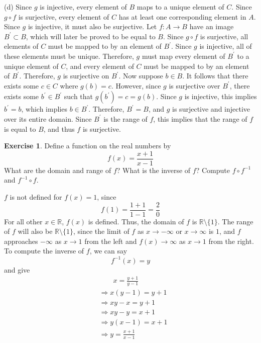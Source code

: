\documentclass{article}
\theoremstyle{definition}
\newtheorem{environment}{Exercise}
\newenvironment{exercise}
    {\begin{mdframed}\begin{environment}}
    {\end{environment}\end{mdframed}}
\begin{document}
(d) Since \(g\) is injective, every element of \(B\) maps to a unique element of \(C\). Since \(g\circ f\) is surjective, every element of \(C\) has at least one corresponding element in \(A\). Since \(g\) is injective, it must also be surjective. Let \(f:A\to B\) have an image \(B^{\prime} \subset B \), which will later be proved to be equal to \(B\). Since \(g\circ f\) is surjective, all elements of \(C\) must be mapped to by an element of \(B^{\prime} \). Since \(g\) is injective, all of these elements must be unique. Therefore, \(g\) must map every element of \(B^{\prime} \) to a unique element of \(C\), and every element of \(C\) must be mapped to by an element of \(B^{\prime} \). Therefore, \(g\) is surjective on \(B^{\prime} \). Now suppose \(b\in B\). It follows that there exists some \(c\in C\) where \(g(b)=c\). However, since \(g\) is surjective over \(B^{\prime} \), there exists some \(b^{\prime} \in B^{\prime} \) such that \(g(b^{\prime} )=c=g(b)\). Since \(g\) is injective, this implies \(b^{\prime} =b\), which implies \(b\in B^{\prime} \). Therefore, \(B^{\prime} =B\), and \(g\) is surjective and injective over its entire domain. Since \(B^{\prime} \) is the range of \(f\), this implies that the range of \(f\) is equal to \(B\), and thus \(f\) is surjective.
\begin{exercise}
    Define a function on the real numbers by
    \[
        f(x) = \frac{x+1}{x-1}
    \]
    What are the domain and range of \(f\)? What is the inverse of \(f\)? Compute \(f\circ f^{-1} \) and \(f^{-1} \circ f\).
\end{exercise}
\(f\) is not defined for \(f(x)=1\), since
\[
    f(1)=\frac{1+1}{1-1}=\frac{2}{0}
\]
For all other \(x\in\mathbb{R} \), \(f(x)\) is defined. Thus, the domain of \(f\) is \(\mathbb{R} \setminus \{ 1 \} \). The range of \(f\) will also be \(\mathbb{R} \setminus \{ 1 \} \), since the limit of \(f\) as \(x\to -\infty\) or \(x\to \infty\) is \(1\), and \(f\) approaches \(-\infty\) as \(x\to 1\) from the left and \(f(x)\to \infty\) as \(x\to 1\) from the right. To compute the inverse of \(f\), we can say
\[
    f^{-1} (x)=y
\]
and give
\begin{align*}
    &\qquad x=\frac{y+1}{y-1}\\
    &\Longrightarrow x(y-1)=y+1\\
    &\Longrightarrow xy-x=y+1\\
    &\Longrightarrow xy-y=x+1\\
    &\Longrightarrow y(x-1)=x+1\\
    &\Longrightarrow y=\frac{x+1}{x-1}
\end{align*}
\end{document}
